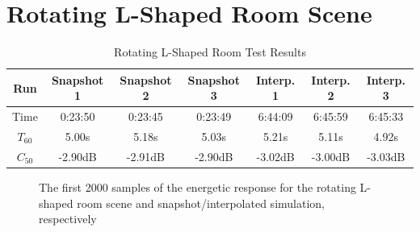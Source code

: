 \section{Rotating L-Shaped Room Scene}\label{sec:LRoom}

\begin{table}[t!]
    \centering
    \begin{tabular}{| c | c | c | c | c | c | c |}
        \hline
        Run        & Snapshot 1 & Snapshot 2 & Snapshot 3 & Interp. 1 & Interp. 2 & Interp. 3 \\
        \hline
        Time       & 0:23:50    & 0:23:45    & 0:23:49    & 6:44:09   & 6:45:59   & 6:45:33   \\
        \hline
        \(T_{60}\) & 5.00s      & 5.18s      & 5.03s      & 5.21s     & 5.11s     & 4.92s     \\
        \hline
        \(C_{50}\) & -2.90dB    & -2.91dB    & -2.90dB    & -3.02dB   & -3.00dB   & -3.03dB   \\
        \hline
    \end{tabular}
    \caption{Rotating L-Shaped Room Test Results}\label{tbl:LSceneTable}
\end{table}

\begin{figure}[t!]
    \begin{center}
        
    \end{center}
    \caption[The start of the energetic responses for test scene 3]{The first 2000 samples of the energetic response for the rotating L-shaped room scene and snapshot/interpolated simulation, respectively}\label{fig:LSceneIR}
\end{figure}

